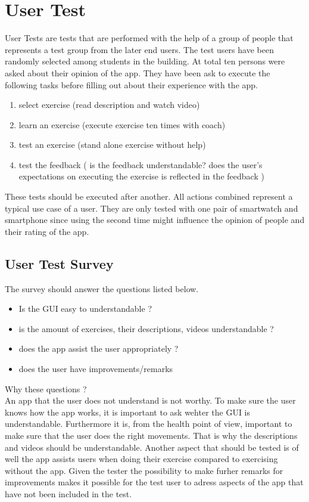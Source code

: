 \section{User Test}
User Tests are tests that are performed with the help of a group of people that represents a test group from the later end users. The test users have been randomly selected among students in the building. At total ten persons were asked about their opinion of the app. They have been ask to execute the following tasks before filling out about their experience with the app.
\begin{enumerate}
\item select exercise (read description and watch video)
\item learn an exercise (execute exercise ten times with coach)
\item test an exercise (stand alone exercise without help)
\item test the feedback ( is the feedback understandable? does the user's expectations on executing the exercise is reflected in the feedback )
\end{enumerate}

These tests should be executed after another. All actions combined represent a typical use case of a user.
They are only tested with one pair of smartwatch and smartphone since using the second time might influence the opinion of people and their rating of the app.

\subsection{User Test Survey}
The survey should answer the questions listed below.
\begin{itemize}
\item Is the GUI easy to understandable ?
\item is the amount of exercises, their descriptions, videos understandable ?
\item does the app assist the user appropriately ?
\item does the user have improvements/remarks
\end{itemize}

Why these questions ?\\
An app that the user does not understand is not worthy. To make sure the user knows how the app works, it is important to ask wehter the GUI is understandable.
Furthermore it is, from the health point of view, important to make sure that the user does the right movements. That is why the descriptions and videos should be understandable. Another aspect that should be tested is of well the app assists users when doing their exercise compared to exercising without the app.
Given the tester the possibility to make furher remarks for improvements makes it possible for the test user to adress aspects of the app that have not been included in the test.

